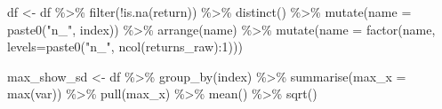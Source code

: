 \documentclass[
  oneside]{book}
\newenvironment{Shaded}{\begin{snugshade}}{\end{snugshade}}
\newcommand{\AttributeTok}[1]{\textcolor[rgb]{0.77,0.63,0.00}{#1}}
\newcommand{\DecValTok}[1]{\textcolor[rgb]{0.00,0.00,0.81}{#1}}
\newcommand{\FunctionTok}[1]{\textcolor[rgb]{0.00,0.00,0.00}{#1}}
\newcommand{\NormalTok}[1]{#1}
\newcommand{\OtherTok}[1]{\textcolor[rgb]{0.56,0.35,0.01}{#1}}
\newcommand{\SpecialCharTok}[1]{\textcolor[rgb]{0.00,0.00,0.00}{#1}}
\newcommand{\StringTok}[1]{\textcolor[rgb]{0.31,0.60,0.02}{#1}}
\begin{document}
\begin{Shaded}
\begin{Highlighting}[]
\NormalTok{df }\OtherTok{\textless{}{-}}\NormalTok{ df }\SpecialCharTok{\%\textgreater{}\%} 
  \FunctionTok{filter}\NormalTok{(}\SpecialCharTok{!}\FunctionTok{is.na}\NormalTok{(return)) }\SpecialCharTok{\%\textgreater{}\%} 
  \FunctionTok{distinct}\NormalTok{() }\SpecialCharTok{\%\textgreater{}\%} 
  \FunctionTok{mutate}\NormalTok{(}\AttributeTok{name =} \FunctionTok{paste0}\NormalTok{(}\StringTok{"n\_"}\NormalTok{, index)) }\SpecialCharTok{\%\textgreater{}\%} 
  \FunctionTok{arrange}\NormalTok{(name) }\SpecialCharTok{\%\textgreater{}\%} 
  \FunctionTok{mutate}\NormalTok{(}\AttributeTok{name =} \FunctionTok{factor}\NormalTok{(name, }\AttributeTok{levels=}\FunctionTok{paste0}\NormalTok{(}\StringTok{"n\_"}\NormalTok{, }\FunctionTok{ncol}\NormalTok{(returns\_raw)}\SpecialCharTok{:}\DecValTok{1}\NormalTok{)))}


\NormalTok{max\_show\_sd }\OtherTok{\textless{}{-}}\NormalTok{ df }\SpecialCharTok{\%\textgreater{}\%} 
  \FunctionTok{group\_by}\NormalTok{(index) }\SpecialCharTok{\%\textgreater{}\%} 
  \FunctionTok{summarise}\NormalTok{(}\AttributeTok{max\_x =} \FunctionTok{max}\NormalTok{(var)) }\SpecialCharTok{\%\textgreater{}\%} 
  \FunctionTok{pull}\NormalTok{(max\_x) }\SpecialCharTok{\%\textgreater{}\%} 
  \FunctionTok{mean}\NormalTok{() }\SpecialCharTok{\%\textgreater{}\%} 
  \FunctionTok{sqrt}\NormalTok{()}


\end{Highlighting}
\end{Shaded}
\end{document}
